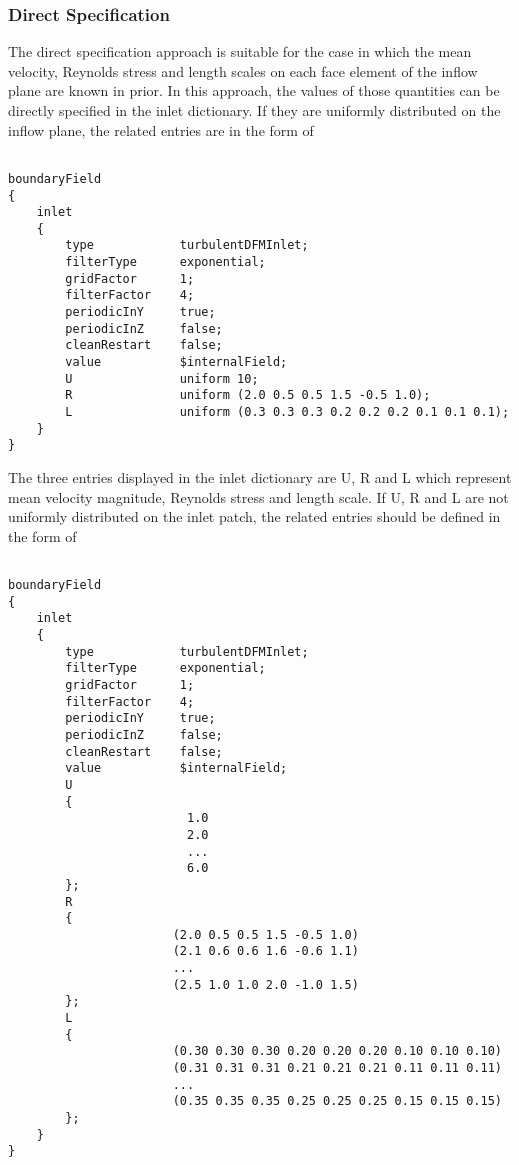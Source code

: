 \subsubsection{Direct Specification}

The direct specification approach is suitable for the case in which the mean velocity, Reynolds stress and length scales on each face element of the inflow plane are known in prior. In this approach, the values of those quantities can be directly specified in the \textcolor{mauve}{inlet} dictionary. If they are uniformly distributed on the inflow plane, the related entries are in the form of

\begin{lstlisting}

boundaryField
{
    inlet
    {
        type            turbulentDFMInlet;
        filterType      exponential;
        gridFactor      1;
        filterFactor    4;
        periodicInY     true;
        periodicInZ     false;
        cleanRestart    false;
        value           $internalField;
        U               uniform 10;
        R               uniform (2.0 0.5 0.5 1.5 -0.5 1.0);
        L               uniform (0.3 0.3 0.3 0.2 0.2 0.2 0.1 0.1 0.1);       
    }
}

\end{lstlisting}

\noindent The three entries displayed in the \textcolor{mauve}{inlet} dictionary are \textcolor{mauve}{U}, \textcolor{mauve}{R} and \textcolor{mauve}{L} which represent mean velocity magnitude, Reynolds stress and length scale. If \textcolor{mauve}{U}, \textcolor{mauve}{R} and \textcolor{mauve}{L} are not uniformly distributed on the inlet patch, the related entries should be defined in the form of

\begin{lstlisting}

boundaryField
{
    inlet
    {
        type            turbulentDFMInlet;
        filterType      exponential;
        gridFactor      1;
        filterFactor    4;
        periodicInY     true;
        periodicInZ     false;
        cleanRestart    false;
        value           $internalField;
        U               
        {
                         1.0
                         2.0
                         ...
                         6.0
        };
        R               
        {
                       (2.0 0.5 0.5 1.5 -0.5 1.0)
                       (2.1 0.6 0.6 1.6 -0.6 1.1)
                       ...
                       (2.5 1.0 1.0 2.0 -1.0 1.5)
        };
        L             
        {
                       (0.30 0.30 0.30 0.20 0.20 0.20 0.10 0.10 0.10)
                       (0.31 0.31 0.31 0.21 0.21 0.21 0.11 0.11 0.11)
                       ...
                       (0.35 0.35 0.35 0.25 0.25 0.25 0.15 0.15 0.15)
        };  
    }
}

\end{lstlisting}

